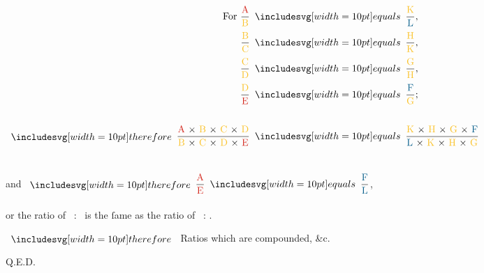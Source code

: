 \documentclass[12pt,preview]{standalone}
\begin{document}
\begin{minipage}{\textwidth}
    \begin{center}
        $\begin{aligned} \text{For } \dfrac{\text{\redA}}{\text{\yellowB}}                                                                      & \bequals \dfrac{\text{\yellowK}}{\text{\blueL}},                                                                      \\[0.5ex]
                \dfrac{\text{\yellowB}}{\text{\yellowC}}                                                                               & \bequals \dfrac{\text{\yellowH}}{\text{\yellowK}},                                                                    \\[0.5ex]
                \dfrac{\text{\yellowC}}{\text{\yellowD}}                                                                               & \bequals \dfrac{\text{\yellowG}}{\text{\yellowH}},                                                                    \\[0.5ex]
                \dfrac{\text{\yellowD}}{\text{\redE}}                                                                                  & \bequals \dfrac{\text{\blueF}}{\text{\yellowG}};                                                                      \\[0.5ex]
                \hfill                                                                                                                                                                                                                                         \\
                \btherefore \dfrac{\text{\redA\ × \yellowB\ × \yellowC\ × \yellowD}}{\text{\yellowB\ × \yellowC\ × \yellowD\ × \redE}} & \bequals \dfrac{\text{\yellowK\ × \yellowH\ × \yellowG\ × \blueF}}{\text{\blueL\ × \yellowK\ × \yellowH\ × \yellowG}}\end{aligned}$\\
        \hfill\\
        \hfill\\
        and $\btherefore \dfrac{\text{\redA}}{\text{\redE}} \bequals \dfrac{\text{\blueF}}{\text{\blueL}}$,\\
        \hfill\\
        or the ratio of \redA\ : \redE\ is the ſame as the ratio of \blueF\ : \blueL.
    \end{center}

    \hfill

    $\btherefore$ Ratios which are compounded, \&c.

    \hfill

    \hfill Q.E.D.
\end{minipage}%
\end{document}
